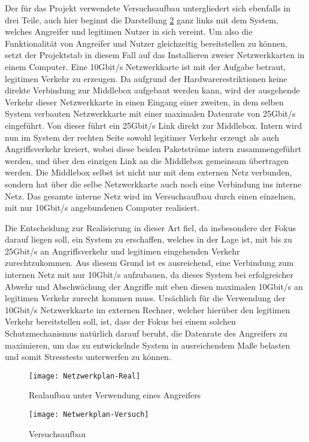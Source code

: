 \documentclass[../review_1.tex]{subfiles}
\begin{document}
Der für das Projekt verwendete Versuchsaufbau untergliedert sich ebenfalls in drei Teile, auch hier beginnt die Darstellung \ref{fig:Versuchsaufbau} ganz links mit dem System, welches Angreifer und legitimen Nutzer in sich vereint. Um also die Funktionalität von Angreifer und Nutzer gleichzeitig bereitstellen zu können, setzt der Projektstab in diesem Fall auf das Installieren zweier Netzwerkkarten in einem Computer. Eine 10Gbit/s Netzwerkkarte ist mit der Aufgabe betraut, legitimen Verkehr zu erzeugen. Da aufgrund der Hardwarerestriktionen keine direkte Verbindung zur Middlebox aufgebaut werden kann, wird der ausgehende Verkehr dieser Netzwerkkarte in einen Eingang einer zweiten, in dem selben System verbauten Netzwerkkarte mit einer maximalen Datenrate von 25Gbit/s eingeführt. Von dieser führt ein 25Gbit/s Link direkt zur Middlebox. Intern wird nun im System der rechten Seite sowohl legitimer Verkehr erzeugt als auch Angriffsverkehr kreiert, wobei diese beiden Paketströme intern zusammengeführt werden, und über den einzigen Link an die Middlebox gemeinsam übertragen werden. Die Middlebox selbst ist nicht nur mit dem externen Netz verbunden, sondern hat über die selbe Netzwerkkarte auch noch eine Verbindung ins interne Netz. Das gesamte interne Netz wird im Versuchsaufbau durch einen einzelnen, mit nur 10Gbit/s angebundenen Computer realisiert.

Die Entscheidung zur Realisierung in dieser Art fiel, da insbesondere der Fokus darauf liegen soll, ein System zu erschaffen, welches in der Lage ist, mit bis zu 25Gbit/s an Angriffsverkehr und legitimen eingehenden Verkehr zurechtzukommen. Aus diesem Grund ist es ausreichend, eine Verbindung zum internen Netz mit nur 10Gbit/s aufzubauen, da dieses System bei erfolgreicher Abwehr und Abschwächung der Angriffe mit eben diesen maximalen 10Gbit/s an legitimen Verkehr zurecht kommen muss. Ursächlich für die Verwendung der 10Gbit/s Netzwerkkarte im externen Rechner, welcher hierüber den legitimen Verkehr bereitstellen soll, ist, dass der Fokus bei einem solchen Schutzmechanismus natürlich darauf beruht, die Datenrate des Angreifers zu maximieren, um das zu entwickelnde System in ausreichendem Maße belasten und somit Stresstests unterwerfen zu können.

\begin{figure}[t]
    \centering
    \texttt{[image: Netzwerkplan-Real]}
    \caption{Realaufbau unter Verwendung eines Angreifers}
    \label{fig:netzwerkplan-real}
\end{figure}
\begin{figure}[t]
	\centering
	\texttt{[image: Netwerkplan-Versuch]}
	\caption{Versuchsaufbau}
	\label{fig:Versuchsaufbau}
\end{figure}
\end{document}

